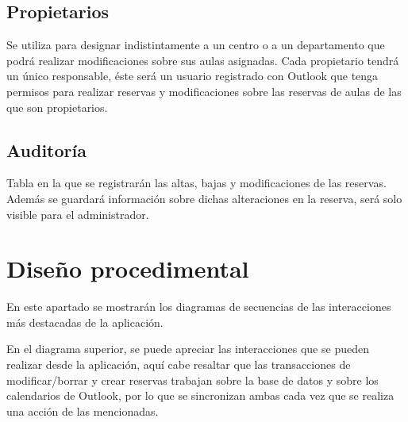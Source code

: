 \subsection{Propietarios}
Se utiliza para designar indistintamente a un centro o a un departamento que podrá realizar modificaciones sobre sus aulas asignadas. Cada propietario tendrá un único responsable, éste será un usuario registrado con Outlook que tenga permisos para realizar reservas y modificaciones sobre las reservas de aulas de las que son propietarios.

\subsection{Auditoría}
Tabla en la que se registrarán las altas, bajas y modificaciones de las reservas. Además se guardará información sobre dichas alteraciones en la reserva, será solo visible para el administrador.

\section{Diseño procedimental}
En este apartado se mostrarán los diagramas de secuencias de las interacciones más destacadas de la aplicación.

En el diagrama superior, se puede apreciar las interacciones que se pueden realizar desde la aplicación, aquí cabe resaltar que las transacciones de modificar/borrar y crear reservas trabajan sobre la base de datos y sobre los calendarios de Outlook, por lo que se sincronizan ambas cada vez que se realiza una acción de las mencionadas.

